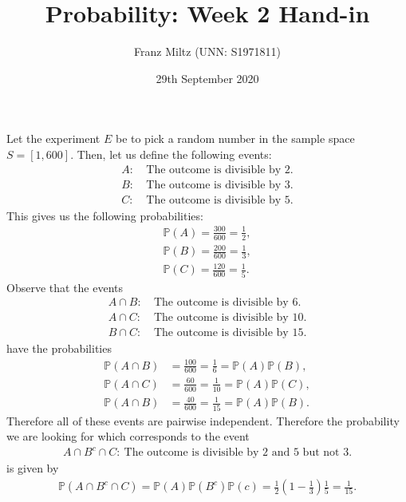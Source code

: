 \documentclass{article}
\renewcommand{\P}{\mathbb{P}}
\begin{document}
\title{Probability: Week 2 Hand-in}
\author{Franz Miltz (UNN: S1971811)}
\date{29th September 2020}
\maketitle
\noindent Let the experiment $E$ be to pick a random number in the sample space
$S=[1,600]$. Then, let us define the following events:
\begin{align*}
  A:\:&\text{The outcome is divisible by 2.}\\
  B:\:&\text{The outcome is divisible by 3.}\\
  C:\:&\text{The outcome is divisible by 5.}
\end{align*}
This gives us the following probabilities:
\begin{align*}
  \P(A)=\frac{300}{600}=\frac{1}{2},\\
  \P(B)=\frac{200}{600}=\frac{1}{3},\\
  \P(C)=\frac{120}{600}=\frac{1}{5}.
\end{align*}
Observe that the events
\begin{align*}
  A\cap B:\:&\text{The outcome is divisible by 6.}\\
  A\cap C:\:&\text{The outcome is divisible by 10.}\\
  B\cap C:\:&\text{The outcome is divisible by 15.}
\end{align*}
have the probabilities
\begin{align*}
  \P(A\cap B)&=\frac{100}{600}=\frac{1}{6}=\P(A)\P(B),\\
  \P(A\cap C)&=\frac{60}{600}=\frac{1}{10}=\P(A)\P(C),\\
  \P(A\cap B)&=\frac{40}{600}=\frac{1}{15}=\P(A)\P(B).
\end{align*}
Therefore all of these events are pairwise independent. Therefore the
probability we are looking for which corresponds to the event
\begin{align*}
  A\cap B^c \cap C:\:\text{The outcome is divisible by 2 and 5 but not 3.}
\end{align*}
is given by
\begin{align*}
  \P(A\cap B^c\cap C)= \P(A)\P(B^c)\P(c) = \frac{1}{2}\left(1-\frac{1}{3}\right)\frac{1}{5}=\frac{1}{15}.
\end{align*}
\end{document}
